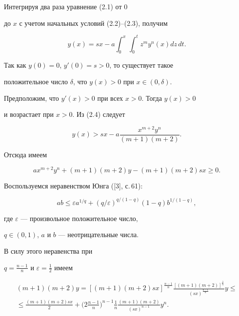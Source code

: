 \begin{pf} Интегрируя два раза уравнение (2.1) от $0$


до $x$ с учетом начальных условий (2.2)--(2.3), получим


\begin{equation}


y(x) = sx-a\int_0^x\,\int_0^tz^my^n(x)dz\,dt.


\end{equation}


Так как $y(0) = 0$, $y'(0) = s > 0$, то существует такое 


положительное число $ \delta $, что $ y(x) > 0 $ при $ x \in (0, \delta) $.


Предположим, что $ y'(x) > 0$ при всех $ x > 0 $. Тогда $ y(x) > 0$


и возрастает при $ x > 0 $. Из (2.4) следует


$$


y(x) > sx - a\frac{x^{m+2}y^n}{(m+1)(m+2)}.


$$


Отсюда имеем


\begin{equation}


ax^{m+2}y^n + (m+1)(m+2)y-(m+1)(m+2)sx \ge 0.


\end{equation}


Воспользуемся неравенством Юнга ([3], с.\,61):


$$


ab \le \varepsilon a^{1/q}+(q/\varepsilon)^{q/(1-q)}(1-q)b^{1/(1-q)},


$$


где $\varepsilon $ --- произвольное положительное число,


$ q \in (0, 1)$, $a $ и $ b $ --- неотрицательные числа. 


В силу этого неравенства при


$ q = \frac{n-1}{n} $ и $ \varepsilon = \frac{1}{2} $ имеем


\begin{multline*}


(m+1)(m+2)y = [(m+1)(m+2)sx]^{\frac{n-1}{n}} 


\frac{[(m+1)(m+2)]^{\frac{1}{n}}}{(sx)^{\frac{n-1}{n}}}y \le \\


\le \frac{(m+1)(m+2)sx}{2} + \bigg(2\frac{n-1}{n}\bigg)^{n-1} \frac{1}{n}


\frac{(m+1)(m+2)}{(sx)^{n-1}} y^n.



\end{multline*}
\end{pf}
